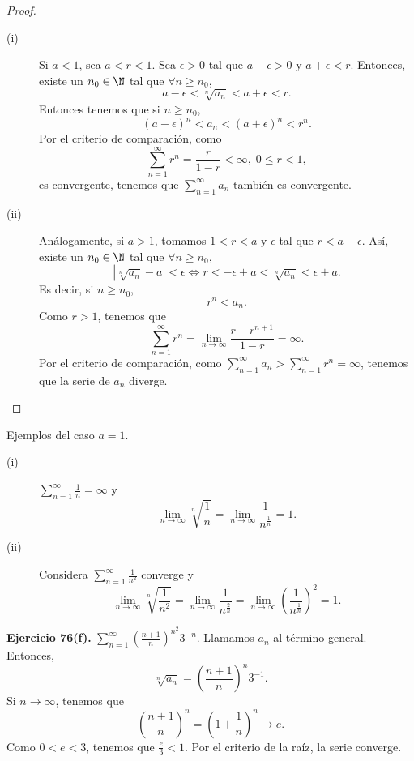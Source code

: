 \begin{proof}
\begin{description}
\item[(i)] Si $\displaystyle a <1  $, sea $\displaystyle a < r < 1 $. Sea $\displaystyle \epsilon > 0 $ tal que $\displaystyle a - \epsilon > 0 $ y $\displaystyle a+\epsilon < r $. Entonces, existe un $\displaystyle n_{0} \in \N $ tal que $\displaystyle \forall n \geq n_{0} $, 
	\[ a - \epsilon < \sqrt[n]{a_{n}} < a+\epsilon < r .\]
Entonces tenemos que si $\displaystyle n \geq n_{0} $, 
\[\left(a-\epsilon \right)^{n} < a_{n} < \left(a+\epsilon \right)^{n} < r^{n} .\]
Por el criterio de comparación, como 
\[\sum^{\infty}_{n = 1}r^{n} = \frac{r}{1-r} < \infty, \; 0 \leq r < 1 ,\]
es convergente, tenemos que $\displaystyle \sum^{\infty}_{n=1}a_{n} $ también es convergente.
\item[(ii)] Análogamente, si $\displaystyle a > 1 $, tomamos $\displaystyle 1 < r < a $ y $\displaystyle \epsilon  $ tal que $\displaystyle r < a-\epsilon  $. Así, existe un $\displaystyle n_{0}\in\N $ tal que $\displaystyle \forall n \geq n_{0} $, 
	\[ \left|\sqrt[n]{a_{n}}-a\right|<\epsilon \iff r < -\epsilon + a < \sqrt[n]{a_{n}}<\epsilon + a .\]
Es decir, si $\displaystyle n \geq n_{0} $,
\[ r^{n} < a_{n} .\]
Como $\displaystyle r > 1 $, tenemos que 
\[\sum^{\infty}_{n = 1}r^{n} = \lim_{n \to \infty}\frac{r-r^{n+1}}{1-r} = \infty .\]
Por el criterio de comparación, como $\displaystyle \sum^{\infty}_{n = 1}a_{n} > \sum^{\infty}_{n=1}r^{n} = \infty $, tenemos que la serie de $\displaystyle a_{n} $ diverge.
\end{description}
\end{proof}

\begin{eg}
\normalfont Ejemplos del caso $\displaystyle a = 1 $. 
\begin{description}
\item[(i)] $\displaystyle \sum^{\infty}_{n =1}\frac{1}{n} = \infty $ y 
	\[\lim_{n \to \infty}\sqrt[n]{\frac{1}{n}} = \lim_{n \to \infty}\frac{1}{n^{\frac{1}{n}}} = 1 .\]
\item[(ii)] Considera $\displaystyle \sum^{\infty}_{n = 1}\frac{1}{n^{2}} $ converge y 
	\[\lim_{n \to \infty}\sqrt[n]{\frac{1}{n^{2}}} = \lim_{n \to \infty}\frac{1}{n^{\frac{2}{n}}} = \lim_{n \to \infty}\left(\frac{1}{n^{\frac{1}{n}}}\right)^{2} = 1 .\]
\end{description}
\end{eg}

\begin{eg}
\normalfont \textbf{Ejercicio 76(f).} $\displaystyle \sum^{\infty}_{n = 1}\left(\frac{n+1}{n}\right)^{n^{2}}3^{-n} $. Llamamos $\displaystyle a_{n} $ al término general. Entonces, 
\[\sqrt[n]{a_{n}} = \left(\frac{n+1}{n}\right)^{n} 3^{-1} .\]
Si $\displaystyle n \to \infty $, tenemos que 
\[\left(\frac{n+1}{n}\right)^{n} = \left(1+\frac{1}{n}\right)^{n} \to e .\]
Como $\displaystyle 0< e < 3 $, tenemos que $\displaystyle \frac{e}{3} < 1 $. Por el criterio de la raíz, la serie converge.
\end{eg}

